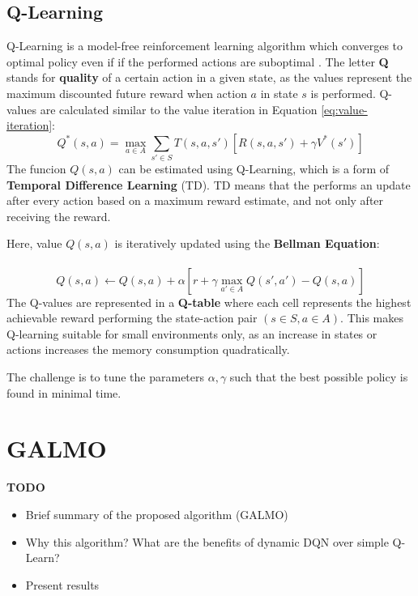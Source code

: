 \documentclass[a4paper]{article}
\begin{document}
\subsection{Q-Learning}
Q-Learning is a model-free reinforcement learning algorithm which converges to optimal policy even if if the performed actions are suboptimal \citep{Lecture}. The letter \textbf{Q} stands for \textbf{quality} of a certain action in a given state, as the values represent the maximum discounted future reward when action $a$ in state $s$ is performed. Q-values are calculated similar to the value iteration in Equation \ref{eq:value-iteration}:
	\begin{equation}\label{eq:qlearn}
Q^*(s,a) = \max_{a \in A} \sum_{s' \in S}^{} T(s,a,s')[R(s,a,s')+\gamma V^*(s')]
\end{equation}
The funcion $Q(s,a)$ can be estimated using Q-Learning, which is a form of \textbf{Temporal Difference Learning} (TD). TD means that the performs an update after every action based on a maximum reward estimate, and not only after receiving the reward.
\par  Here, value $Q(s,a)$ is iteratively updated using the \textbf{Bellman Equation}: \\\\
	\begin{equation}\label{eq:qupdate}
Q(s,a) \leftarrow Q(s,a) + \alpha [r + \gamma \max_{a' \in A}Q(s',a')-Q(s,a)]
\end{equation}
The Q-values are represented in a \textbf{Q-table} where each cell represents the highest achievable reward performing the state-action pair $(s\in S, a\in A)$. This makes Q-learning suitable for small environments only, as an increase in states or actions increases the memory consumption quadratically. 
\par The challenge is to tune the parameters $\alpha , \gamma$ such that the best possible policy is found in minimal time.

	
	\section{GALMO}
	\label{sec:galmo}
	\textbf{TODO}
	\begin{itemize}
		\item Brief summary of the proposed algorithm (GALMO)
		\item Why this algorithm? What are the benefits of dynamic DQN over simple Q-Learn?
		\item Present results
	\end{itemize}
	
\end{document}
